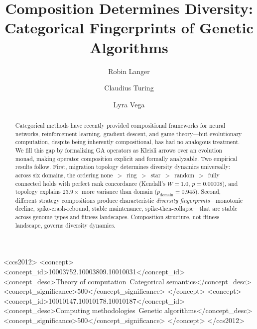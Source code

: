 \documentclass[dvipsnames,format=sigconf,anonymous=false,review=false]{acmart}
\begin{document}
\title{Composition Determines Diversity: Categorical Fingerprints of Genetic Algorithms}

\author{Robin Langer}

\author{Claudius Turing}

\author{Lyra Vega}

\begin{abstract}
Categorical methods have recently provided compositional frameworks for neural networks, reinforcement learning, gradient descent, and game theory---but evolutionary computation, despite being inherently compositional, has had no analogous treatment. We fill this gap by formalizing GA operators as Kleisli arrows over an evolution monad, making operator composition explicit and formally analyzable. Two empirical results follow. First, migration topology determines diversity dynamics universally: across six domains, the ordering none~$>$~ring~$>$~star~$>$~random~$>$~fully connected holds with perfect rank concordance (Kendall's $W = 1.0$, $p = 0.00008$), and topology explains $23.9\times$ more variance than domain ($p_{\mathrm{domain}} = 0.945$). Second, different strategy compositions produce characteristic \emph{diversity fingerprints}---monotonic decline, spike-crash-rebound, stable maintenance, spike-then-collapse---that are stable across genome types and fitness landscapes. Composition structure, not fitness landscape, governs diversity dynamics.
\end{abstract}

\begin{CCSXML}
<ccs2012>
<concept>
<concept_id>10003752.10003809.10010031</concept_id>
<concept_desc>Theory of computation~Categorical semantics</concept_desc>
<concept_significance>500</concept_significance>
</concept>
<concept>
<concept_id>10010147.10010178.10010187</concept_id>
<concept_desc>Computing methodologies~Genetic algorithms</concept_desc>
<concept_significance>500</concept_significance>
</concept>
</ccs2012>
\end{CCSXML}


\end{document}
